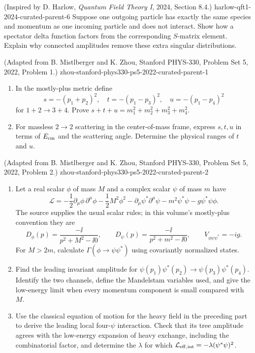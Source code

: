 \begin{enumerate}
  {(Inspired by D. Harlow, \emph{Quantum Field Theory I}, 2024, Section 8.4.)}
  {harlow-qft1-2024-curated-parent-6}
Suppose one outgoing particle has exactly the same species and momentum as
one incoming particle and does not interact.  Show how a spectator delta
function factors from the corresponding \(S\)-matrix element.  Explain
why connected amplitudes remove these extra singular distributions.

  {(Adapted from B. Mistlberger and K. Zhou, Stanford PHYS-330, Problem Set 5, 2022, Problem 1.)}
  {zhou-stanford-phys330-ps5-2022-curated-parent-1}
\begin{enumerate}
\item
In the mostly-plus metric define
\[
 s=-(p_1+p_2)^2,\quad t=-(p_1-p_3)^2,\quad
 u=-(p_1-p_4)^2
\]
for \(1+2\to3+4\).  Prove
\(s+t+u=m_1^2+m_2^2+m_3^2+m_4^2\).
\item
For massless \(2\to2\) scattering in the center-of-mass frame, express
\(s,t,u\) in terms of \(E_{\rm cm}\) and the scattering angle.  Determine
the physical ranges of \(t\) and \(u\).
\end{enumerate}

  {(Adapted from B. Mistlberger and K. Zhou, Stanford PHYS-330, Problem Set 5, 2022, Problem 2.)}
  {zhou-stanford-phys330-ps5-2022-curated-parent-2}
\begin{enumerate}
\item
Let a real scalar \(\phi\) of mass \(M\) and a complex scalar \(\psi\) of
mass \(m\) have
\[
 \mathcal L=
 -\frac12\partial_\mu\phi\,\partial^\mu\phi-\frac12M^2\phi^2
 -\partial_\mu\psi^*\partial^\mu\psi-m^2\psi^*\psi
 -g\psi^*\psi\phi .
\]
The source supplies the usual scalar rules; in this volume's mostly-plus
convention they are
\[
 D_\phi(p)=\frac{-\ii}{p^2+M^2-\ii0},\qquad
 D_\psi(p)=\frac{-\ii}{p^2+m^2-\ii0},\qquad
 V_{\phi\psi\psi^*}=-ig.
\]
For \(M>2m\), calculate
\(\Gamma(\phi\to\psi\psi^*)\) using covariantly normalized states.
\item
Find the leading invariant amplitude for
\(\psi(p_1)\psi^*(p_2)\to\psi(p_3)\psi^*(p_4)\).  Identify the two
channels, define the Mandelstam variables used, and give the low-energy
limit when every momentum component is small compared with \(M\).
\item
Use the classical equation of motion for the heavy field in the preceding
part to derive the leading local four-\(\psi\) interaction.  Check
that its tree amplitude agrees with the low-energy expansion of heavy
exchange, including the combinatorial factor, and determine the
\(\lambda\) for which
\(\mathcal L_{\rm eff,int}=-\lambda(\psi^*\psi)^2\).
\end{enumerate}


\end{enumerate}
